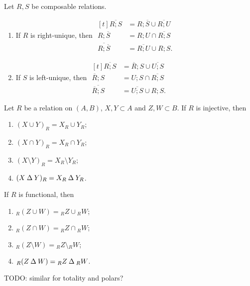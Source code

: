 \begin{lemma} \label{uniquenessResiduals}
Let $R,S$ be composable relations.
\begin{enumerate}
\item If $R$ is right-unique, then $\begin{aligned}[t]
\overline{R;S} &= R;\overline{S} \cup \overline{R;U} \\
R;\overline{S} &= R;U\cap \overline{R;S} \\
\overline{R;\overline{S}} &= \overline{R;U} \cup R;S.
\end{aligned}$
\item If $S$ is left-unique, then $\begin{aligned}[t]
\overline{R;S} &= \overline{R};S \cup \overline{U;S} \\
\overline{R};S &= U;S\cap \overline{R;S} \\
\overline{\overline{R};S} &= \overline{U;S}\cup R;S.
\end{aligned}$
\end{enumerate}
\end{lemma}

\begin{lemma} \label{imagePreimageUniqueness}
Let $R$ be a relation on $(A, B)$, $X,Y\subset A$ and $Z,W\subset B$. If $R$ is injective, then
\begin{enumerate}
\item $(X\cup Y)_R = X_R\cup Y_R$;
\item $(X\cap Y)_R = X_R\cap Y_R$;
\item $(X\setminus Y)_R = X_R\setminus Y_R$;
\item $(X\mathbin{\Delta} Y)_R = X_R\mathbin{\Delta} Y_R$.
\end{enumerate}
If $R$ is functional, then
\begin{enumerate}
\item $_R(Z\cup W) = {_RZ}\cup {_RW}$;
\item $_R(Z\cap W) = {_RZ}\cap {_RW}$;
\item $_R(Z\setminus W) = {_RZ}\setminus {_RW}$;
\item $_R(Z\mathbin{\Delta} W) = {_RZ}\mathbin{\Delta} {_RW}$.
\end{enumerate}
\end{lemma}
TODO: similar for totality and polars?

